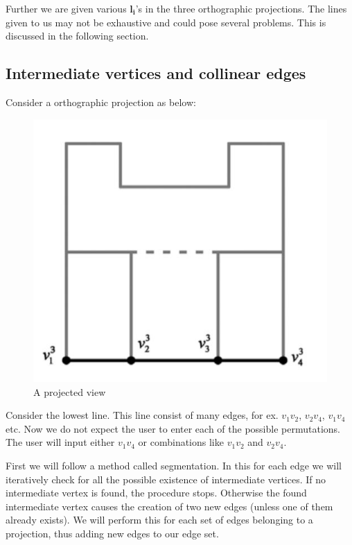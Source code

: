 \documentclass[a4paper,11pt,openany]{book}
\begin{document}
Further we are given various $\boldsymbol{l_i}$'s in the three orthographic projections. The lines given to us may not be exhaustive and could pose several problems. This is discussed in the following section.

\subsection{Intermediate vertices and collinear edges}

Consider a orthographic projection as below:
\begin{figure}[h]
\centering
\includegraphics[scale=0.5]{ProjectedView}
\caption{A projected view}
\end{figure}

Consider the lowest line. This line consist of many edges, for ex. $v_1v_2$, $v_2v_4$, $v_1v_4$ etc. Now we do not expect the user to enter each of the possible permutations. The user will input either $v_1v_4$ or combinations like $v_1v_2$ and $v_2v_4$.

First we will follow a method called segmentation. In this for each edge we will iteratively check for all the possible existence of intermediate vertices. If no intermediate vertex is found, the procedure stops. Otherwise the found intermediate
vertex causes the creation of two new edges (unless one of them
already exists). We will perform this for each set of edges belonging to a projection, thus adding new edges to our edge set.
\end{document}
